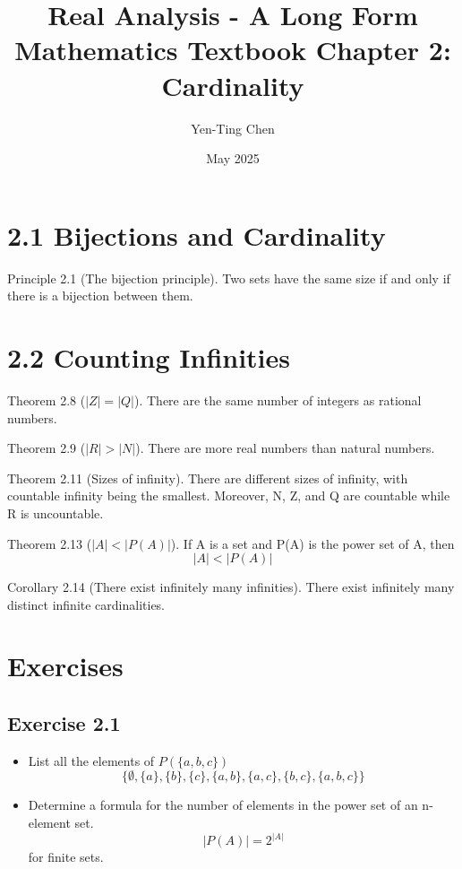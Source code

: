\documentclass[12pt]{article}
\title{Real Analysis - A Long Form Mathematics Textbook Chapter 2: Cardinality}
\author{Yen-Ting Chen}
\date{May 2025}
\begin{document}
	\maketitle
	\section*{2.1 Bijections and Cardinality}
		Principle 2.1 (The bijection principle). Two sets have the same size if and only if there is a bijection between them.
		
	\section*{2.2 Counting Infinities}
		Theorem 2.8 ($|Z| = |Q|$). There are the same number of integers as rational numbers.
		
		Theorem 2.9 ($|R| > |N|$). There are more real numbers than natural numbers.
		
		Theorem 2.11 (Sizes of infinity). There are different sizes of infinity, with countable infinity being the smallest. Moreover, N, Z, and Q are countable while R is uncountable.
		
		Theorem 2.13 ($|A| < |P(A)|$). If A is a set and P(A) is the power set of A, then
		\begin{equation}
			|A| < |P(A)|
		\end{equation}
		
		Corollary 2.14 (There exist infinitely many infinities). There exist infinitely many distinct infinite cardinalities.
	\section*{Exercises}
		\subsection*{Exercise 2.1}
			\begin{itemize}
				\item List all the elements of $P(\{a,b,c\})$
					\begin{equation}
						\{\emptyset, \{a\},\{b\},\{c\},\{a,b\},\{a,c\},\{b,c\},\{a,b,c\}\}
					\end{equation}
				\item Determine a formula for the number of elements in the power set of an n-element set.
					\begin{equation}
						|P(A)| = 2^{|A|}
					\end{equation}
					for finite sets.
			\end{itemize}
\end{document}
